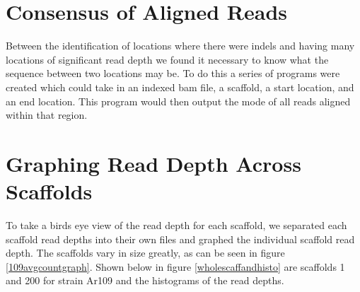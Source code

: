 \documentclass[12pt]{article}
\begin{document}
%
%
\vspace{-0.5cm}
\section{Consensus of Aligned Reads}
\vspace{-0.5cm}
	Between the identification of locations where there were indels and having many locations of significant read depth we found it necessary to know what the sequence between two locations may be. To do this a series of programs were created which could take in an indexed bam file, a scaffold, a start location, and an end location. This program would then output the mode of all reads aligned within that region. 

%
%
\vspace{-0.5cm}
\section{Graphing Read Depth Across Scaffolds}
\vspace{-0.5cm}
	To take a birds eye view of the read depth for each scaffold, we separated each scaffold read depths into their own files and graphed the individual scaffold read depth. The scaffolds vary in size greatly, as can be seen in figure \ref{109avgcountgraph}. Shown below in figure \ref{wholescaffandhisto} are scaffolds 1 and 200 for strain Ar109 and the histograms of the read depths.
\end{document}
